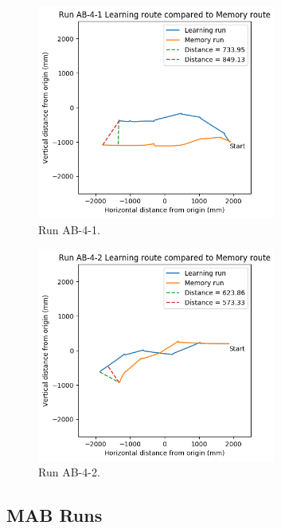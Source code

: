 \documentclass[a4paper,11pt,twoside,openright]{article}
\begin{document}
\begin{figure}[h!]
 \centering
  \includegraphics[width=0.7\textwidth]{AB-4-1}
  \caption{
    \label{fig:ab-4-1} Run AB-4-1.
  }
\end{figure}

\begin{figure}[h!]
 \centering
  \includegraphics[width=0.7\textwidth]{AB-4-2}
  \caption{
    \label{fig:ab-4-2} Run AB-4-2.
  }
\end{figure}
\FloatBarrier
\newpage

\subsection{MAB Runs}
\end{document}

